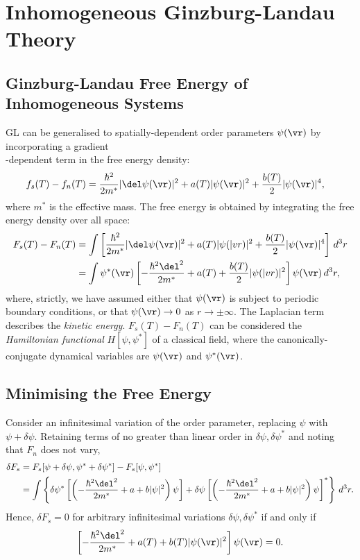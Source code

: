 \documentclass[a4paper, 11pt, normalem]{report}
\begin{document}
\chapter{Inhomogeneous Ginzburg-Landau Theory}
\section{Ginzburg-Landau Free Energy of Inhomogeneous Systems}
GL can be generalised to spatially-dependent order parameters $\psi(\vr)$ by incorporating a gradient \\-dependent term in the free energy density:
\begin{align}
    f_s(T) - f_n(T) &= \frac{\hbar^2}{2m^*}|\del\psi(\vr)|^2 + a(T)|\psi(\vr)|^2 + \frac{b(T)}{2}|\psi(\vr)|^4,
\end{align}
where $m^*$ is the effective mass.
The free energy is obtained by integrating the free energy density over all space:
\begin{align}
    F_s(T) - F_n(T) &= \int \left[\frac{\hbar^2}{2m^*}|\del\psi(\vr)|^2 + a(T)|\psi(|vr)|^2 + \frac{b(T)}{2}|\psi(\vr)|^4\right]\,d^3r \\
                    &= \int \psi^*(\vr)\left[-\frac{\hbar^2\del^2}{2m^*}+a(T)+\frac{b(T)}{2}|\psi(|vr)|^2\right]\psi(\vr)\,d^3r,
\end{align}
where, strictly, we have assumed either that $\psi(\vr)$ is subject to periodic boundary conditions, or that $\psi(\vr)\to0$ as $r\to\pm\infty$.
The Laplacian term describes the \emph{kinetic energy}.
$F_s(T)-F_n(T)$ can be considered the \emph{Hamiltonian functional} $H[\psi,\psi^*]$ of a classical field, where the canonically-conjugate dynamical variables are $\psi(\vr)$ and $\psi^*(\vr)$.

\section{Minimising the Free Energy}
Consider an infinitesimal variation of the order parameter, replacing $\psi$ with $\psi+\delta\psi$.
Retaining terms of no greater than linear order in $\delta\psi,\delta\psi^*$ and noting that $F_n$ does not vary,
\begin{align}
    \delta F_s &= F_s[\psi+\delta\psi,\psi^*+\delta\psi^*] - F_s[\psi,\psi^*] \\
               &= \int \left\{\delta\psi^*\left[\left(-\frac{\hbar^2\del^2}{2m^*}+a+b|\psi|^2\right)\psi\right] + \delta\psi\left[\left(-\frac{\hbar^2\del^2}{2m^*}+a+b|\psi|^2\right)\psi\right]^*\right\}\,d^3r.
\end{align}
Hence, $\delta F_s=0$ for arbitrary infinitesimal variations $\delta\psi,\delta\psi^*$ if and only if
\begin{align}
    \left[-\frac{\hbar^2\del^2}{2m^*}+a(T)+b(T)|\psi(\vr)|^2\right]\psi(\vr)=0.
\end{align}
\end{document}
